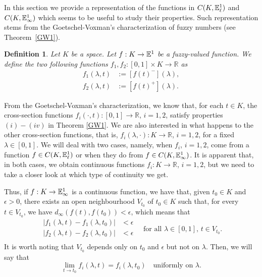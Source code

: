 \documentclass{amsart}
\newtheorem{definition}[theorem]{Definition}
\newcommand{\R}{{\mathbb{R}}}
\newcommand{\fn}{\mathbb{E}\sp{1}}
\begin{document}
%
%



In this section we provide a representation of the functions in $C(K,\fn_{\ell})$ and $C(K,\fn_{\infty})$ which seems to be useful to study their properties. Such representation stems from the Goetschel-Voxman's characterization of fuzzy numbers (see Theorem~\ref{GW1}).



\begin{definition}\label{f1f2}
Let $K$ be a space. Let $f:K\rightarrow \fn$ be a fuzzy-valued function. We define the two following functions
$f_1,f_2:[0,1]\times K\rightarrow\R$ as
\[
\begin{aligned}
f_1(\lambda,t)&:=[f(t)^-](\lambda),\\
f_2(\lambda,t)&:=[f(t)^+](\lambda).
\end{aligned}
\]
\end{definition}

\bigskip
From the Goetschel-Voxman's characterization, we know that, for each $t\in K$, the cross-section functions $f_i(\cdot,t):[0,1]\rightarrow\R$, $i=1,2$, satisfy
properties $(i)-(iv)$ in Theorem \ref{GW1}. We are also interested in what happens to the other cross-section functions, that is, $f_i(\lambda,\cdot):K\rightarrow\R$, $i=1,2$, for a fixed $\lambda \in [0,1]$. We will deal with two cases, namely, when $f_i$, $i=1,2$, come from a function $f\in C(K,\fn_{\ell})$  or when they do from  $f\in C(K,\fn_{\infty})$. It is apparent that, in both cases, we obtain continuous functions $f_i:K\rightarrow \R$, $i=1,2$, but we need to take a closer look at which type of continuity we get.



Thus, if $f:K\rightarrow \fn_{\infty}$ is a continuous function, we have that, given $t_0\in K$ and $\epsilon>0$, there exists an open neighbourhood $ V_{t_0}$ of $t_0\in K$ such that, for every $t\in V_{t_0}$, we have
$d_{\infty}(f(t),f(t_0))<\epsilon$,
which means that
\[
\begin{aligned}
|f_1(\lambda,t)-f_1(\lambda,t_0)|&<\epsilon \\
|f_2(\lambda,t)-f_2(\lambda,t_0)|&<\epsilon \\
\end{aligned}\quad \text {for all $\lambda\in[0,1]$,\ $t\in V_{t_0}$.}
\]
It is worth noting that $V_{t_0}$ depends only on $t_0$ and $\epsilon$ but not on $\lambda$.
Then, we will say that
\begin{equation}\label{eq:uniformLambda}
\lim_{t\to t_0} f_i(\lambda,t)=f_i(\lambda,t_0)\quad\text{uniformly on $\lambda$.}
\end{equation}
\end{document}
